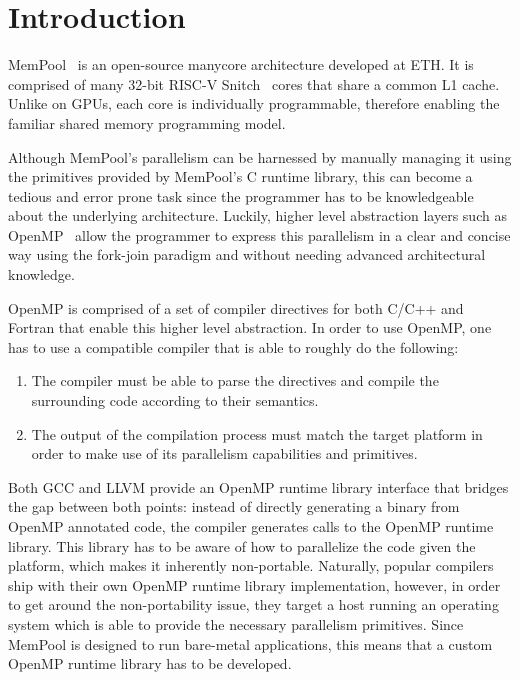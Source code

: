 \chapter{Introduction} \label{ch:introduction}

MemPool~\cite{mempool} is an open-source manycore architecture developed at ETH. It is comprised of
many 32-bit RISC-V Snitch~\cite{snitch} cores that share a common L1 cache. Unlike on GPUs, each
core is individually programmable, therefore enabling the familiar shared memory programming model.

Although MemPool's parallelism can be harnessed by manually managing it using the primitives
provided by MemPool's C runtime library, this can become a tedious and error prone task since the
programmer has to be knowledgeable about the underlying architecture. Luckily, higher level
abstraction layers such as OpenMP~\cite{openmp} allow the programmer to express this parallelism in
a clear and concise way using the fork-join paradigm and without needing advanced architectural
knowledge.

OpenMP is comprised of a set of compiler directives for both C/C++ and Fortran that enable this
higher level abstraction. In order to use OpenMP, one has to use a compatible compiler that is able
to roughly do the following:

\begin{enumerate}
	\item The compiler must be able to parse the directives and compile the surrounding code
	      according to their semantics.
	\item The output of the compilation process must match the target platform in order to make use
	      of its parallelism capabilities and primitives.
\end{enumerate}

Both GCC and LLVM provide an OpenMP runtime library interface that bridges the gap between both
points: instead of directly generating a binary from OpenMP annotated code, the compiler generates
calls to the OpenMP runtime library. This library has to be aware of how to parallelize the code
given the platform, which makes it inherently non-portable. Naturally, popular compilers ship with
their own OpenMP runtime library implementation, however, in order to get around the non-portability
issue, they target a host running an operating system which is able to provide the necessary
parallelism primitives. Since MemPool is designed to run bare-metal applications, this means that
a custom OpenMP runtime library has to be developed.

